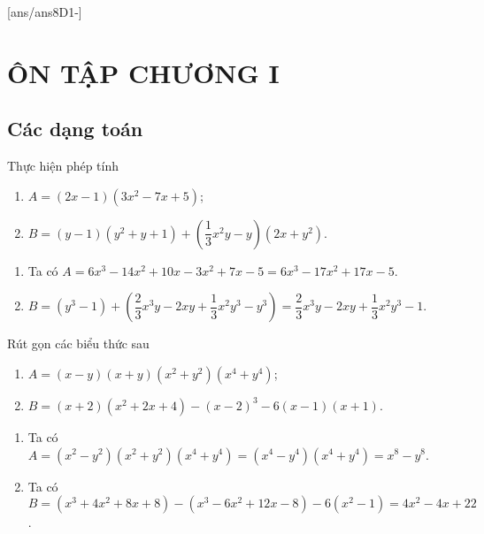 [ans/ans8D1-]
\section{ÔN TẬP CHƯƠNG I}
\subsection{Các dạng toán}
\begin{dang}
\end{dang}
\begin{vd}
Thực hiện phép tính
\begin{enumerate}
	\item $ A=(2x-1)(3x^{2}-7x+5) $;
	\item $ B=(y-1)(y^{2}+y+1)+\left(\dfrac{1}{3}x^{2}y-y\right)(2x+y^{2}) $.
\end{enumerate}
\loigiai
{
	\begin{enumerate}
		\item Ta có $ A=6x^{3}-14x^{2}+10x-3x^{2}+7x-5=6x^{3}-17x^{2}+17x-5 $.
		\item $ B=(y^{3}-1)+\left(\dfrac{2}{3}x^{3}y-2xy+\dfrac{1}{3}x^{2}y^{3}-y^{3}\right)=\dfrac{2}{3}x^{3}y-2xy+\dfrac{1}{3}x^{2}y^{3}-1 $.
	\end{enumerate}
}
\end{vd}
\begin{vd}
	Rút gọn các biểu thức sau
	\begin{enumerate}
		\item $ A=(x-y)(x+y)(x^{2}+y^{2})(x^{4}+y^{4}) $;
		\item $ B=(x+2)(x^{2}+2x+4)-(x-2)^{3}-6(x-1)(x+1) $.
	\end{enumerate}
	\loigiai
	{
	\begin{enumerate}
		\item Ta có $ A=(x^{2}-y^{2})(x^{2}+y^{2})(x^{4}+y^{4})=(x^{4}-y^{4})(x^{4}+y^{4})=x^{8}-y^{8} $.
		\item Ta có $ B=(x^{3}+4x^{2}+8x+8)-(x^{3}-6x^{2}+12x-8)-6(x^{2}-1)=4x^{2}-4x+22 $.
	\end{enumerate}	
	}
\end{vd}

